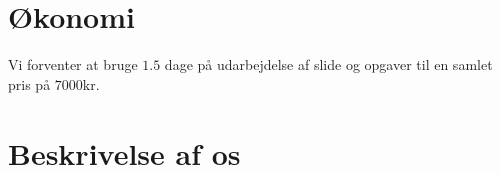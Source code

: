 \documentclass{article}
\begin{document}
\section{Økonomi}
    Vi forventer at bruge $1.5$ dage på udarbejdelse af slide og opgaver til en
    samlet pris på $7000$kr.

\section{Beskrivelse af os}

%
%
%
\end{document}

